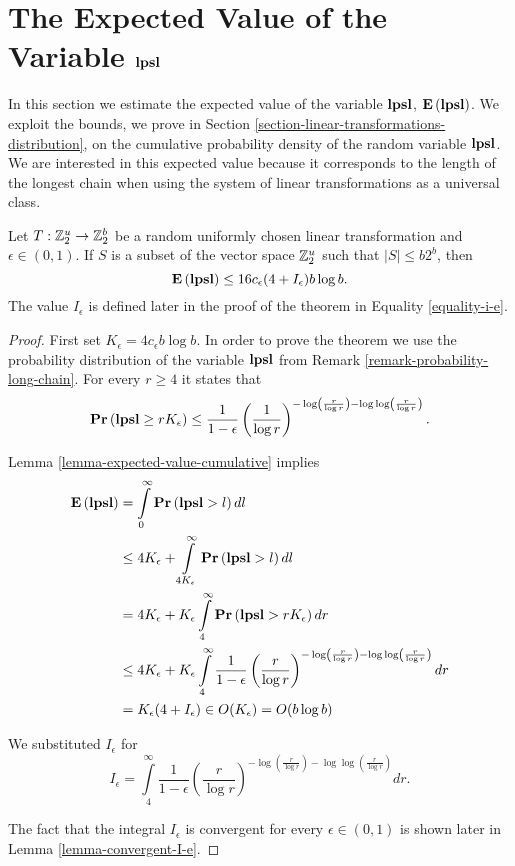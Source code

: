 \section{The Expected Value of the Variable \texorpdfstring{$\mathbf{lpsl}$}{lpsl}}
In this section we estimate the expected value of the variable $\mathbf{lpsl}$, $\mathbf{E}\left(\mathbf{lpsl}\right)$. We exploit the bounds, we prove in Section \ref{section-linear-transformations-distribution}, on the cumulative probability density of the random variable $\mathbf{lpsl}$. We are interested in this expected value because it corresponds to the length of the longest chain when using the system of linear transformations as a universal class.

\begin{theorem}
\label{theorem-n-logn-to-n}
Let $T: \mathbb{Z}_{2}^{u} \rightarrow \mathbb{Z}_{2}^{b}$ be a random uniformly chosen linear transformation and $\epsilon \in (0, 1)$. If $S$ is a subset of the vector space $\mathbb{Z}_{2}^{u}$ such that $|S| \leq b 2 ^ b$, then \[ \mathbf{E}\left(\mathbf{lpsl}\right) \leq 16 c_\epsilon(4 + I_\epsilon) b \log b \text{.} \] The value $I_\epsilon$ is defined later in the proof of the theorem in Equality \ref{equality-i-e}.
\end{theorem}
\begin{proof}
First set $K_\epsilon = 4 c_\epsilon b \log b$. In order to prove the theorem we use the probability distribution of the variable $\mathbf{lpsl}$ from Remark \ref{remark-probability-long-chain}. For every $r \geq 4$ it states that 
\[ 
\mathbf{Pr}\left(\mathbf{lpsl} \geq r K_\epsilon\right) \leq \frac{1}{1 - \epsilon}\left(\frac{1}{\log r}\right) ^ {-\log\left(\frac{r}{\log r}\right) - \log \log \left(\frac{r}{\log r}\right)} \text{.} 
\]

Lemma \ref{lemma-expected-value-cumulative} implies 
\[
\begin{split}
\mathbf{E}\left(\mathbf{lpsl}\right)
	& = \int\limits_0^{\infty} \mathbf{Pr}\left(\mathbf{lpsl} > l\right) dl \\
	& \leq 4K_\epsilon + \int\limits_{4K_\epsilon}^\infty \mathbf{Pr}\left(\mathbf{lpsl} > l\right) dl \\
	& = 4K_\epsilon + K_\epsilon \int\limits_4^\infty \mathbf{Pr}\left(\mathbf{lpsl} > rK_\epsilon\right) dr \\
	& \leq 4K_\epsilon + K_\epsilon \int\limits_4^\infty \frac{1}{1 - \epsilon} \left(\frac{r}{\log r}\right)^{-\log \left(\frac{r}{\log r}\right) - \log \log \left(\frac{r}{\log r}\right)} dr \\
	& = K_\epsilon(4 + I_\epsilon) \in O(K_\epsilon) = O(b \log b)
\end{split}
\]

We substituted $I_\epsilon$ for
\begin{equation}
\label{equality-i-e}
I_\epsilon = \int\limits_4^\infty \frac{1}{1 - \epsilon} \left(\frac{r}{\log r}\right)^{-\log \left(\frac{r}{\log r}\right) - \log \log \left(\frac{r}{\log r}\right)} dr \text{.}
\end{equation}

The fact that the integral $I_\epsilon$ is convergent for every $\epsilon \in (0, 1)$ is shown later in Lemma \ref{lemma-convergent-I-e}.
\end{proof}

